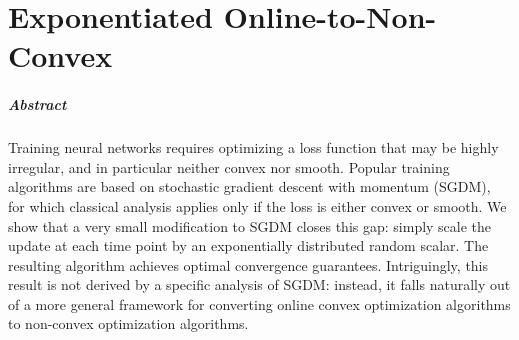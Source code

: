 \chapter{Exponentiated Online-to-Non-Convex}
\label{chapter:exp-o2nc}
\thispagestyle{myheadings}

\paragraph{Abstract}
Training neural networks requires optimizing a loss function that may be highly irregular, and in particular neither convex nor smooth. Popular training algorithms are based on stochastic gradient  descent with momentum (SGDM), for which classical analysis applies only if the loss is either convex  or smooth. We show that a very small modification to SGDM closes this gap: simply scale the update at each time point by an exponentially  distributed random scalar. The resulting algorithm achieves optimal convergence guarantees. Intriguingly, this result is not derived by a specific analysis of SGDM: instead, it falls naturally out of a more general framework for converting online convex optimization algorithms to non-convex optimization algorithms.







    
% 




% 
% 
% 
% 